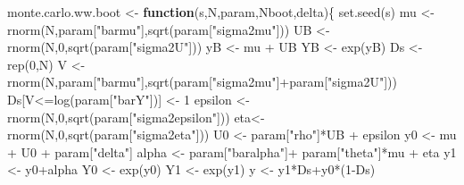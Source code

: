 \documentclass[
]{book}
\newenvironment{Shaded}{\begin{snugshade}}{\end{snugshade}}
\newcommand{\ControlFlowTok}[1]{\textcolor[rgb]{0.13,0.29,0.53}{\textbf{#1}}}
\newcommand{\DecValTok}[1]{\textcolor[rgb]{0.00,0.00,0.81}{#1}}
\newcommand{\FunctionTok}[1]{\textcolor[rgb]{0.00,0.00,0.00}{#1}}
\newcommand{\NormalTok}[1]{#1}
\newcommand{\OtherTok}[1]{\textcolor[rgb]{0.56,0.35,0.01}{#1}}
\newcommand{\SpecialCharTok}[1]{\textcolor[rgb]{0.00,0.00,0.00}{#1}}
\newcommand{\StringTok}[1]{\textcolor[rgb]{0.31,0.60,0.02}{#1}}
\theoremstyle{definition}
\theoremstyle{definition}
\theoremstyle{definition}
\theoremstyle{definition}
\theoremstyle{remark}
\begin{document}
\begin{Shaded}
\begin{Highlighting}[]
\NormalTok{monte.carlo.ww.boot }\OtherTok{\textless{}{-}} \ControlFlowTok{function}\NormalTok{(s,N,param,Nboot,delta)\{}
  \FunctionTok{set.seed}\NormalTok{(s)}
\NormalTok{  mu }\OtherTok{\textless{}{-}} \FunctionTok{rnorm}\NormalTok{(N,param[}\StringTok{"barmu"}\NormalTok{],}\FunctionTok{sqrt}\NormalTok{(param[}\StringTok{"sigma2mu"}\NormalTok{]))}
\NormalTok{  UB }\OtherTok{\textless{}{-}} \FunctionTok{rnorm}\NormalTok{(N,}\DecValTok{0}\NormalTok{,}\FunctionTok{sqrt}\NormalTok{(param[}\StringTok{"sigma2U"}\NormalTok{]))}
\NormalTok{  yB }\OtherTok{\textless{}{-}}\NormalTok{ mu }\SpecialCharTok{+}\NormalTok{ UB }
\NormalTok{  YB }\OtherTok{\textless{}{-}} \FunctionTok{exp}\NormalTok{(yB)}
\NormalTok{  Ds }\OtherTok{\textless{}{-}} \FunctionTok{rep}\NormalTok{(}\DecValTok{0}\NormalTok{,N)}
\NormalTok{  V }\OtherTok{\textless{}{-}} \FunctionTok{rnorm}\NormalTok{(N,param[}\StringTok{"barmu"}\NormalTok{],}\FunctionTok{sqrt}\NormalTok{(param[}\StringTok{"sigma2mu"}\NormalTok{]}\SpecialCharTok{+}\NormalTok{param[}\StringTok{"sigma2U"}\NormalTok{]))}
\NormalTok{  Ds[V}\SpecialCharTok{\textless{}=}\FunctionTok{log}\NormalTok{(param[}\StringTok{"barY"}\NormalTok{])] }\OtherTok{\textless{}{-}} \DecValTok{1} 
\NormalTok{  epsilon }\OtherTok{\textless{}{-}} \FunctionTok{rnorm}\NormalTok{(N,}\DecValTok{0}\NormalTok{,}\FunctionTok{sqrt}\NormalTok{(param[}\StringTok{"sigma2epsilon"}\NormalTok{]))}
\NormalTok{  eta}\OtherTok{\textless{}{-}} \FunctionTok{rnorm}\NormalTok{(N,}\DecValTok{0}\NormalTok{,}\FunctionTok{sqrt}\NormalTok{(param[}\StringTok{"sigma2eta"}\NormalTok{]))}
\NormalTok{  U0 }\OtherTok{\textless{}{-}}\NormalTok{ param[}\StringTok{"rho"}\NormalTok{]}\SpecialCharTok{*}\NormalTok{UB }\SpecialCharTok{+}\NormalTok{ epsilon}
\NormalTok{  y0 }\OtherTok{\textless{}{-}}\NormalTok{ mu }\SpecialCharTok{+}\NormalTok{  U0 }\SpecialCharTok{+}\NormalTok{ param[}\StringTok{"delta"}\NormalTok{]}
\NormalTok{  alpha }\OtherTok{\textless{}{-}}\NormalTok{ param[}\StringTok{"baralpha"}\NormalTok{]}\SpecialCharTok{+}\NormalTok{  param[}\StringTok{"theta"}\NormalTok{]}\SpecialCharTok{*}\NormalTok{mu }\SpecialCharTok{+}\NormalTok{ eta}
\NormalTok{  y1 }\OtherTok{\textless{}{-}}\NormalTok{ y0}\SpecialCharTok{+}\NormalTok{alpha}
\NormalTok{  Y0 }\OtherTok{\textless{}{-}} \FunctionTok{exp}\NormalTok{(y0)}
\NormalTok{  Y1 }\OtherTok{\textless{}{-}} \FunctionTok{exp}\NormalTok{(y1)}
\NormalTok{  y }\OtherTok{\textless{}{-}}\NormalTok{ y1}\SpecialCharTok{*}\NormalTok{Ds}\SpecialCharTok{+}\NormalTok{y0}\SpecialCharTok{*}\NormalTok{(}\DecValTok{1}\SpecialCharTok{{-}}\NormalTok{Ds)}

\end{Highlighting}
\end{Shaded}
\end{document}

